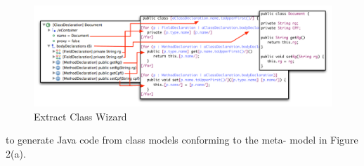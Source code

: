 \begin{figure}[!ht]
\centering
  \includegraphics[scale=0.48]{figure/ForwardEngineering}
\caption{Extract Class Wizard}
\label{fig:wizard}
\end{figure}





to generate Java code from class models conforming to the meta- model in Figure 2(a).



